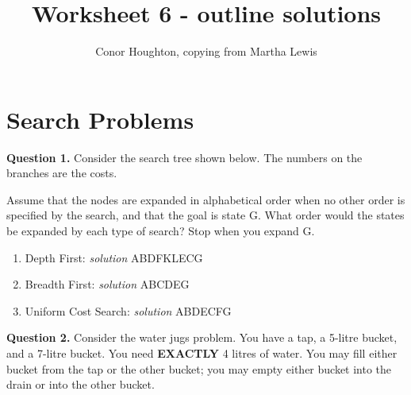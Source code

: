 \documentclass[a4paper,12pt]{article}
\title{Worksheet 6 - outline solutions}
\author{Conor Houghton, copying from Martha Lewis}
\date{}
\begin{document}
\maketitle

\section*{Search Problems}

\textbf{Question 1.} Consider the search tree shown below. The numbers on the branches are the costs.
\begin{center}
\end{center}

Assume that the nodes are expanded in alphabetical order when no other order is specified by the search, and that the goal is state G. What order would the states be expanded by each type of search? Stop when you expand G.

\begin{enumerate}
    \item Depth First: \textsl{solution} ABDFKLECG
    \item Breadth First: \textsl{solution} ABCDEG
    \item Uniform Cost Search: \textsl{solution} ABDECFG
\end{enumerate}

\noindent \textbf{Question 2.} Consider the water jugs problem. You have a tap, a 5-litre bucket, and a 7-litre bucket. You need \textbf{EXACTLY} 4 litres of water. You may fill either bucket from the tap or the other bucket; you may empty either bucket into the drain or into the other bucket.
\end{document}

